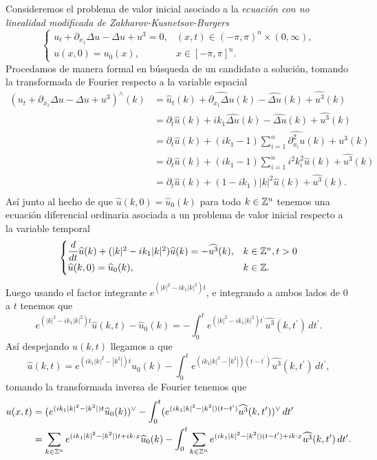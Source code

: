 Consideremos el problema de valor inicial asociado a la \textit{ecuación con no linealidad modificada de Zakharov-Kusnetsov-Burgers}
\begin{equation}\label{ZKB}
    \begin{cases}
    u_t+\partial_{x_1}\Delta u-\Delta u+u^3=0, & (x,t)\in(-\pi,\pi)^n\times(0,\infty),\\
    u(x,0)=u_0(x), & x\in[-\pi,\pi]^n.
\end{cases}
\end{equation}
Procedamos de manera formal en búsqueda de un candidato a solución, tomando la transformada de Fourier respecto a la variable espacial
\begin{align*}
   (u_t+\partial_{x_1}\Delta u-\Delta u+u^3)^{\wedge}(k)&= \widehat{u}_t(k)+\widehat{\partial_{x_1}\Delta u}(k)-\widehat{\Delta u}(k)+\widehat{u^3}(k)\\
   &=\partial_t\widehat{u}(k)+ik_1\widehat{\Delta u}(k)-\widehat{\Delta u}(k)+\widehat{u^3}(k)\\
   &=\partial_t\widehat{u}(k)+(ik_1-1)\sum_{i=1}^n\widehat{\partial^2_{x_i}u}(k)+\widehat{u^3}(k)\\
   &=\partial_t\widehat{u}(k)+(ik_1-1)\sum_{i=1}^ni^2k_i^2\widehat{u}(k)+\widehat{u^3}(k)\\
   &=\partial_t\widehat{u}(k)+(1-ik_1)|k|^2\widehat{u}(k)+\widehat{u^3}(k).\\
\end{align*}
Así junto al hecho de que $\widehat{u}(k,0)=\widehat{u}_0(k)$ para todo $k\in\mathbb{Z}^n$ tenemos una ecuación diferencial ordinaria asociada a un problema de valor inicial respecto a la variable temporal 
$$\begin{cases}
    \dfrac{d}{dt}\widehat{u}(k)+(|k|^2-ik_1|k|^2)\widehat{u}(k)=-\widehat{u^3}(k), & k\in\mathbb{Z}^n,t>0\\
    \widehat{u}(k,0)=\widehat{u}_0(k), &k\in\mathbb{Z}.
\end{cases}$$
Luego usando el factor integrante $e^{(|k|^2-ik_1|k|^2)t}$, e integrando a ambos lados de 0 a $t$ tenemos que
$$e^{(|k|^2-ik_1|k|^2)t}\widehat{u}(k,t)-\widehat{u}_0(k)=-\int_0^te^{(|k|^2-ik_1|k|^2)t^\prime}\widehat{u^3}(k,t^\prime)\,dt^\prime.$$
Así despejando $\widehat{u}(k,t)$ llegamos a que
$$\widehat{u}(k,t)=e^{(ik_1|k|^2-|k^2|)t}\widehat{u}_0(k)-\int_0^te^{(ik_1|k|^2-|k^2|)(t-t^\prime)}\widehat{u^3}(k,t^\prime)\,dt^\prime,$$
tomando la transformada inversa de Fourier tenemos que
\begin{align*}
    u(x,t)&=(e^{(ik_1|k|^2-|k^2|)t}\widehat{u}_0(k))^{\vee}-\int_0^t(e^{(ik_1|k|^2-|k^2|)(t-t^\prime)}\widehat{u^3}(k,t^\prime))^{\vee}\,dt^\prime\\
    &=\sum_{k\in\mathbb{Z}^n}e^{(ik_1|k|^2-|k^2|)t+ik\cdot x}\widehat{u}_0(k)-\int_0^t\sum_{k\in\mathbb{Z}^n}e^{(ik_1|k|^2-|k^2|)(t-t^\prime)+ik\cdot x}\widehat{u^3}(k,t^\prime)\,dt^\prime.
\end{align*}
